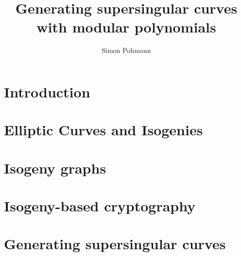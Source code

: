 \documentclass{ociamthesis}
\title{Generating supersingular curves with modular polynomials}
\author{Simon Pohmann}
\theoremstyle{definition}
\begin{document}
\maketitle




\begin{romanpages}
    \tableofcontents
\end{romanpages}

\chapter{Introduction}



\chapter{Elliptic Curves and Isogenies}



\chapter{Isogeny graphs}



\chapter{Isogeny-based cryptography}



\chapter{Generating supersingular curves}



\printbibliography
\end{document}
